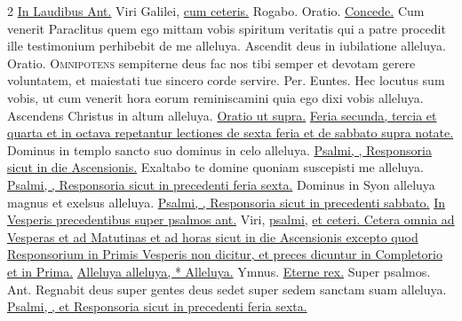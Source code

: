 \begin{multicols*}{2}
\newline \ul{In Laudibus Ant.} Viri Galilei, \ul{cum ceteris.}
 Rogabo. {\color{Red} Oratio.} \hyperlink{concede-ascensionis}{Concede.}
 Cum venerit Paraclitus quem ego mittam vobis spiritum veritatis qui a patre procedit ille testimonium perhibebit de me alleluya. \V Ascendit deus in iubilatione alleluya. {\color{Red} Oratio.}
\lettrine[lines=2]{\zallmancaps \color{Red} O}{mnipotens} sempiterne deus fac nos tibi semper et devotam gerere voluntatem, et maiestati tue sincero corde servire. Per.
 Euntes.
 Hec locutus sum vobis, ut cum venerit hora eorum reminiscamini quia ego dixi vobis alleluya. \V Ascendens Christus in altum alleluya. \ul{Oratio ut supra.}
\newline \ul{Feria secunda, tercia et quarta et in octava repetantur lectiones de sexta feria et de sabbato supra notate.}
 Dominus in templo sancto suo dominus in celo alleluya. \ul{Psalmi, \Vbar , Responsoria sicut in die Ascensionis.}
 Exaltabo te domine quoniam suscepisti me alleluya. \ul{Psalmi, \Vbar , Responsoria sicut in precedenti feria sexta.}
 Dominus in Syon alleluya magnus et exelsus alleluya. \ul{Psalmi, \Vbar , Responsoria sicut in precedenti sabbato.}
{\color{Red} }
 \ul{In Vesperis precedentibus super psalmos ant.} Viri, \ul{psalmi,}  \ul{et ceteri. Cetera omnia ad Vesperas et ad Matutinas et ad horas sicut in die Ascensionis excepto quod Responsorium in Primis Vesperis non dicitur, et preces dicuntur in Completorio et in Prima.}
 \hyperlink{alleluya-invitatorium}{Alleluya alleluya, * Alleluya.} {\color{Red} Ymnus.} \hyperlink{eterne-rex-altissime}{Eterne rex.} {\color{Red} Super psalmos. Ant.} Regnabit deus super gentes deus sedet super sedem sanctam suam alleluya. \ul{Psalmi, \Vbar , et Responsoria sicut in precedenti feria sexta.}

\end{multicols*}
